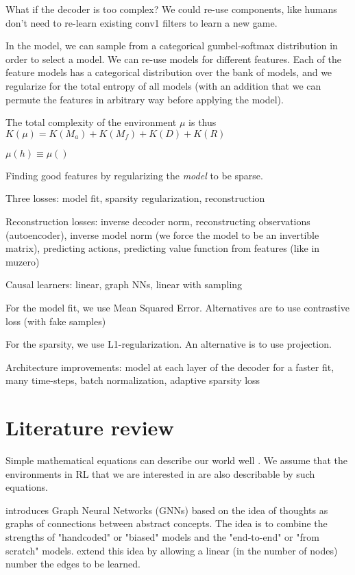 \documentclass[a4paper,11pt,oneside]{report}
\begin{document}
What if the decoder is too complex? We could re-use components, like humans don't need to re-learn existing conv1 filters to learn a new game.

In the model, we can sample from a categorical gumbel-softmax distribution in order to select a model. We can re-use models for different features. Each of the feature models has a categorical distribution over the bank of models, and we regularize for the total entropy of all models (with an addition that we can permute the features in arbitrary way before applying the model).


The total complexity of the environment $\mu$ is thus $K(\mu)=K(M_a)+K(M_f)+K(D)+K(R)$


$\mu(h)\equiv \mu()$

Finding good features by regularizing the {\em model} to be sparse.

Three losses: model fit, sparsity regularization, reconstruction

Reconstruction losses: inverse decoder norm, reconstructing observations (autoencoder), inverse model norm (we force the model to be an invertible matrix), predicting actions, predicting value function from features (like in muzero)

Causal learners: linear, graph NNs, linear with sampling

For the model fit, we use Mean Squared Error. Alternatives are to use contrastive loss (with fake samples)

For the sparsity, we use L1-regularization. An alternative is to use projection.

Architecture improvements: model at each layer of the decoder for a faster fit, many time-steps, batch normalization, adaptive sparsity loss

\section{Literature review}

Simple mathematical equations can describe our world well \cite{hamming1980unreasonable}. We assume that the environments in RL that we are interested in are also describable by such equations.

\cite{Battaglia2018} introduces Graph Neural Networks (GNNs) based on the idea of thoughts as graphs of connections between abstract concepts. The idea is to combine the strengths of "handcoded" or "biased" models and the "end-to-end" or "from scratch" models. \cite{Velickovic2020} extend this idea by allowing a linear (in the number of nodes) number the edges to be learned.
\end{document}
